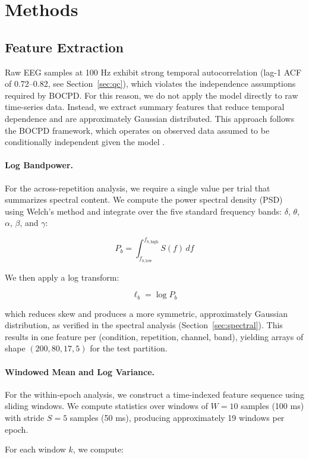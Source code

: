 \documentclass[11pt,letterpaper]{article}
\begin{document}
\section{Methods}

\subsection{Feature Extraction}

Raw EEG samples at 100 Hz exhibit strong temporal autocorrelation (lag-1 ACF of 0.72--0.82, see Section~\ref{sec:qc}), which violates the independence assumptions required by BOCPD. For this reason, we do not apply the model directly to raw time-series data. Instead, we extract summary features that reduce temporal dependence and are approximately Gaussian distributed. This approach follows the BOCPD framework, which operates on observed data assumed to be conditionally independent given the model \citep{adams2007bocpd}.

\paragraph{Log Bandpower.} For the across-repetition analysis, we require a single value per trial that summarizes spectral content. We compute the power spectral density (PSD) using Welch’s method and integrate over the five standard frequency bands: $\delta$, $\theta$, $\alpha$, $\beta$, and $\gamma$:

\[
P_b = \int_{f_{b,\text{low}}}^{f_{b,\text{high}}} S(f)\, df
\]

We then apply a log transform:

\[
\ell_b = \log P_b
\]

which reduces skew and produces a more symmetric, approximately Gaussian distribution, as verified in the spectral analysis (Section~\ref{sec:spectral}). This results in one feature per (condition, repetition, channel, band), yielding arrays of shape $(200, 80, 17, 5)$ for the test partition.

\paragraph{Windowed Mean and Log Variance.}
For the within-epoch analysis, we construct a time-indexed feature sequence using sliding windows. We compute statistics over windows of $W=10$ samples (100 ms) with stride $S=5$ samples (50 ms), producing approximately 19 windows per epoch.

For each window $k$, we compute:
\end{document}
